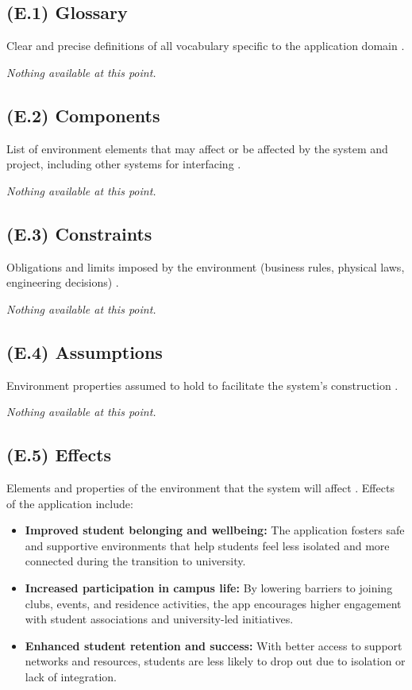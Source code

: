 \documentclass[12pt,letterpaper]{article}
\begin{document}
\subsection{(E.1) Glossary}
Clear and precise definitions of all vocabulary specific to the application domain \cite{meyer2022}.

\textit{Nothing available at this point.}

\subsection{(E.2) Components}
List of environment elements that may affect or be affected by the system and project, including other systems for interfacing \cite{meyer2022}.

\textit{Nothing available at this point.}

\subsection{(E.3) Constraints}
Obligations and limits imposed by the environment (business rules, physical laws, engineering decisions) \cite{meyer2022}.

\textit{Nothing available at this point.}

\subsection{(E.4) Assumptions}
Environment properties assumed to hold to facilitate the system’s construction \cite{meyer2022}.

\textit{Nothing available at this point.}

\subsection{(E.5) Effects}
Elements and properties of the environment that the system will affect \cite{meyer2022}. Effects of the application include:
\begin{itemize}
  \item \textbf{Improved student belonging and wellbeing:} The application fosters safe and supportive environments that help students feel less isolated and more connected during the transition to university.
  \item \textbf{Increased participation in campus life:} By lowering barriers to joining clubs, events, and residence activities, the app encourages higher engagement with student associations and university-led initiatives.
  \item \textbf{Enhanced student retention and success:} With better access to support networks and resources, students are less likely to drop out due to isolation or lack of integration.
\end{itemize}
\end{document}
